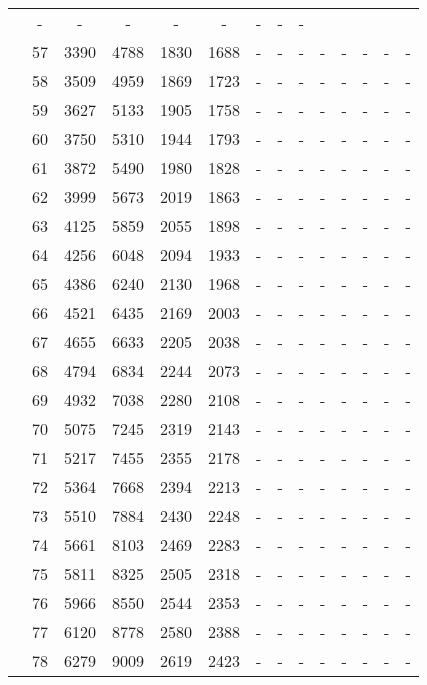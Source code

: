 \begin{table}[htb]
{\begin{tabular}{|c|c|c|c|c|c|c|c|c|c|c|c|c|c|}
 & - & -
 & - & -
 & - & -
 & - & -
 \\
 & 
57 & 3390 & 4788 & 1830 & 1688
 & - & -
 & - & -
 & - & -
 & - & -
 \\
 & 
58 & 3509 & 4959 & 1869 & 1723
 & - & -
 & - & -
 & - & -
 & - & -
 \\
 & 
59 & 3627 & 5133 & 1905 & 1758
 & - & -
 & - & -
 & - & -
 & - & -
 \\
 & 
60 & 3750 & 5310 & 1944 & 1793
 & - & -
 & - & -
 & - & -
 & - & -
 \\
 & 
61 & 3872 & 5490 & 1980 & 1828
 & - & -
 & - & -
 & - & -
 & - & -
 \\
 & 
62 & 3999 & 5673 & 2019 & 1863
 & - & -
 & - & -
 & - & -
 & - & -
 \\
 & 
63 & 4125 & 5859 & 2055 & 1898
 & - & -
 & - & -
 & - & -
 & - & -
 \\
 & 
64 & 4256 & 6048 & 2094 & 1933
 & - & -
 & - & -
 & - & -
 & - & -
 \\
 & 
65 & 4386 & 6240 & 2130 & 1968
 & - & -
 & - & -
 & - & -
 & - & -
 \\
 & 
66 & 4521 & 6435 & 2169 & 2003
 & - & -
 & - & -
 & - & -
 & - & -
 \\
 & 
67 & 4655 & 6633 & 2205 & 2038
 & - & -
 & - & -
 & - & -
 & - & -
 \\
 & 
68 & 4794 & 6834 & 2244 & 2073
 & - & -
 & - & -
 & - & -
 & - & -
 \\
 & 
69 & 4932 & 7038 & 2280 & 2108
 & - & -
 & - & -
 & - & -
 & - & -
 \\
 & 
70 & 5075 & 7245 & 2319 & 2143
 & - & -
 & - & -
 & - & -
 & - & -
 \\
 & 
71 & 5217 & 7455 & 2355 & 2178
 & - & -
 & - & -
 & - & -
 & - & -
 \\
 & 
72 & 5364 & 7668 & 2394 & 2213
 & - & -
 & - & -
 & - & -
 & - & -
 \\
 & 
73 & 5510 & 7884 & 2430 & 2248
 & - & -
 & - & -
 & - & -
 & - & -
 \\
 & 
74 & 5661 & 8103 & 2469 & 2283
 & - & -
 & - & -
 & - & -
 & - & -
 \\
 & 
75 & 5811 & 8325 & 2505 & 2318
 & - & -
 & - & -
 & - & -
 & - & -
 \\
 & 
76 & 5966 & 8550 & 2544 & 2353
 & - & -
 & - & -
 & - & -
 & - & -
 \\
 & 
77 & 6120 & 8778 & 2580 & 2388
 & - & -
 & - & -
 & - & -
 & - & -
 \\
 & 
78 & 6279 & 9009 & 2619 & 2423
 & - & -
 & - & -
 & - & -
 & - & -
 \\

\end{tabular}}
\end{table}
